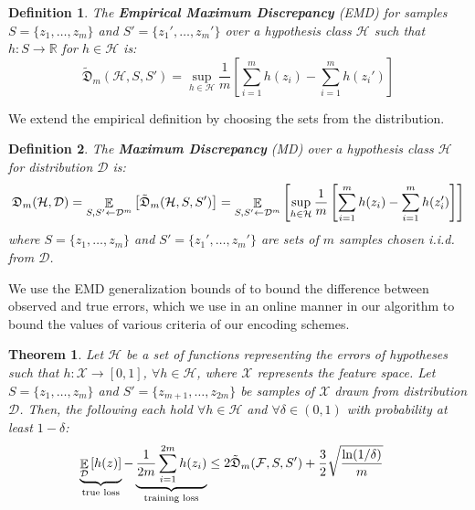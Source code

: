 \documentclass{article}
\newtheorem{theorem}{Theorem}[section]
\newtheorem{definition}{Definition}[section]
\newcommand{\expectation}[2][]{\mathop{\mathbb{E}}\displaylimits_{#1}\left[ #2 \right]}
\newcommand{\md}{\mathfrak{D}}
\newcommand{\emd}{\tilde{\md}}
\begin{document}
\begin{definition}
The \textbf{Empirical Maximum Discrepancy} (EMD) for samples $S = \{z_1, \dots, z_m\}$ and $S' = \{z_1', \dots, z_{m}'\}$ over a hypothesis class $\mathcal{H}$ such that $h: S \rightarrow \mathbb{R}$ for $h \in \mathcal{H}$ is:
\[\emd_m(\mathcal{H}, S, S') = \sup_{h \in \mathcal{H}}\frac{1}{m}\left[\sum_{i=1}^m  h(z_i) -  \sum_{i=1}^m  h(z_i') \right]\]
\end{definition}

We extend the empirical definition by choosing the sets from the distribution.

\begin{definition}
The \textbf{Maximum Discrepancy} (MD) over a hypothesis class $\mathcal{H}$ for distribution $\mathcal{D}$ is:
\[\md_m(\mathcal{H},\mathcal{D}) = \expectation[S,S' \leftarrow \mathcal{D}^m]{\emd_m(\mathcal{H}, S, S')} =  \expectation[S, S' \leftarrow \mathcal{D}^m]{\sup_{h \in \mathcal{H}}\frac{1}{m}\left[\sum_{i=1}^m  h(z_i) -  \sum_{i=1}^m  h(z_i') \right]} \]
where $S = \{z_1, \dots, z_m\}$ and $S' = \{z_1', \dots, z_m'\}$ are sets of $m$ samples chosen i.i.d. from $\mathcal{D}$.
\end{definition}

We use the EMD generalization bounds of \cite{bartlett-emd} to bound the difference between observed and true errors, which we use in an online manner in our algorithm to bound the values of various criteria of our encoding schemes.
\begin{theorem}
    Let $\mathcal{H}$ be a set of functions representing the errors of hypotheses such that $h: \mathcal{X} \rightarrow [0,1]$, $\forall h \in \mathcal{H}$, where $\mathcal{X}$ represents the feature space. Let $S = \{z_1, \dots, z_{m}\}$ and $S' = \{z_{m+1}, \dots, z_{2m}\}$ be samples of $\mathcal{X}$ drawn from distribution $\mathcal{D}$. Then, the following each hold $\forall h \in \mathcal{H}$ and $\forall \delta \in (0,1)$ with probability at least $1 - \delta$:
    \begin{align*}
    \underbrace{\expectation[\mathcal{D}]{h(z)}}_{\text{true loss}} - \underbrace{\frac{1}{2m} \sum_{i=1}^{2m} h(z_i)}_{\text{training loss}} &\leq  2 \emd_m(\mathcal{F}, S, S') + \frac{3}{2} \sqrt{\frac{\ln(1 / \delta)}{m}} 
    \end{align*}
\end{theorem}
\end{document}
